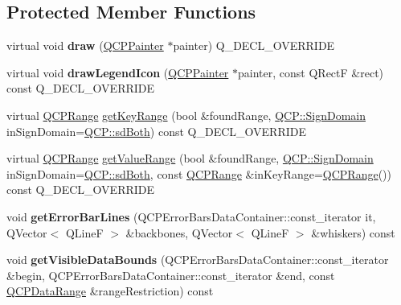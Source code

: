 \subsection*{Protected Member Functions}
\begin{DoxyCompactItemize}
\item 
virtual void {\bfseries draw} (\hyperlink{classQCPPainter}{Q\+C\+P\+Painter} $\ast$painter) Q\+\_\+\+D\+E\+C\+L\+\_\+\+O\+V\+E\+R\+R\+I\+DE\hypertarget{classQCPErrorBars_a801e85931372abf2a1034bfb2eac5cd2}{}\label{classQCPErrorBars_a801e85931372abf2a1034bfb2eac5cd2}

\item 
virtual void {\bfseries draw\+Legend\+Icon} (\hyperlink{classQCPPainter}{Q\+C\+P\+Painter} $\ast$painter, const Q\+RectF \&rect) const Q\+\_\+\+D\+E\+C\+L\+\_\+\+O\+V\+E\+R\+R\+I\+DE\hypertarget{classQCPErrorBars_a20f5d292e66103f26bca00b11ce417b4}{}\label{classQCPErrorBars_a20f5d292e66103f26bca00b11ce417b4}

\item 
virtual \hyperlink{classQCPRange}{Q\+C\+P\+Range} \hyperlink{classQCPErrorBars_a6cac828a430d66ac77a167549d01d212}{get\+Key\+Range} (bool \&found\+Range, \hyperlink{namespaceQCP_afd50e7cf431af385614987d8553ff8a9}{Q\+C\+P\+::\+Sign\+Domain} in\+Sign\+Domain=\hyperlink{namespaceQCP_afd50e7cf431af385614987d8553ff8a9aa38352ef02d51ddfa4399d9551566e24}{Q\+C\+P\+::sd\+Both}) const Q\+\_\+\+D\+E\+C\+L\+\_\+\+O\+V\+E\+R\+R\+I\+DE
\item 
virtual \hyperlink{classQCPRange}{Q\+C\+P\+Range} \hyperlink{classQCPErrorBars_ab76215a186ae4862235821e028685f26}{get\+Value\+Range} (bool \&found\+Range, \hyperlink{namespaceQCP_afd50e7cf431af385614987d8553ff8a9}{Q\+C\+P\+::\+Sign\+Domain} in\+Sign\+Domain=\hyperlink{namespaceQCP_afd50e7cf431af385614987d8553ff8a9aa38352ef02d51ddfa4399d9551566e24}{Q\+C\+P\+::sd\+Both}, const \hyperlink{classQCPRange}{Q\+C\+P\+Range} \&in\+Key\+Range=\hyperlink{classQCPRange}{Q\+C\+P\+Range}()) const Q\+\_\+\+D\+E\+C\+L\+\_\+\+O\+V\+E\+R\+R\+I\+DE
\item 
void {\bfseries get\+Error\+Bar\+Lines} (Q\+C\+P\+Error\+Bars\+Data\+Container\+::const\+\_\+iterator it, Q\+Vector$<$ Q\+LineF $>$ \&backbones, Q\+Vector$<$ Q\+LineF $>$ \&whiskers) const \hypertarget{classQCPErrorBars_afafbd781f0e702a773524d7ee9220741}{}\label{classQCPErrorBars_afafbd781f0e702a773524d7ee9220741}

\item 
void {\bfseries get\+Visible\+Data\+Bounds} (Q\+C\+P\+Error\+Bars\+Data\+Container\+::const\+\_\+iterator \&begin, Q\+C\+P\+Error\+Bars\+Data\+Container\+::const\+\_\+iterator \&end, const \hyperlink{classQCPDataRange}{Q\+C\+P\+Data\+Range} \&range\+Restriction) const \hypertarget{classQCPErrorBars_a4d86d520222be51851106312dff75c49}{}\label{classQCPErrorBars_a4d86d520222be51851106312dff75c49}


\end{DoxyCompactItemize}
